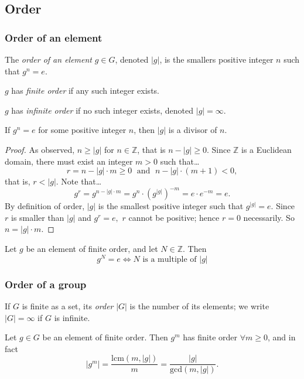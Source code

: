 \subsection{Order}

\subsubsection{Order of an element}\label{elementorder}
The \emph{order of an element} $g \in G$, denoted $|g|$, is the smallers positive integer $n$ such that $g^n = e$.

\noindent $g$ has \emph{finite order} if any such integer exists.\newline

\noindent $g$ has \emph{infinite order} if no such integer exists, denoted $|g| = \infty$.\newline

\begin{lemma}
\label{orderdividesothernums}
If $g^n = e$ for some positive integer $n$, then $|g|$ is a divisor of $n$.
\end{lemma}

\begin{proof}
As observed, $n \geq |g|$ for $n \in \mathbb{Z}$, that is $n - |g| \geq 0$. Since $\mathbb{Z}$ is a Euclidean domain, there must exist
an integer $m > 0$ such that\dots
$$r = n -|g|\cdot m \geq 0 \; \textrm{ and } \; n - |g| \cdot (m + 1) < 0,$$
that is, $r < |g|$. Note that\dots
$$g^r = g^{n - |g| \cdot m} = g^n \cdot (g^{|g|})^{-m} = e \cdot e^{-m} = e.$$
By definition of order, $|g|$ is the smallest positive integer such that $g^{|g|}=e.$ Since $r$ is smaller than $|g|$ and $g^r = e,$ $r$ cannot
be positive; hence $r = 0$ necessarily. So $n = |g| \cdot m$.
\end{proof}

\begin{corollary}
Let $g$ be an element of finite order, and let $N \in \mathbb{Z}$. Then
$$g^N = e \Leftrightarrow N \textrm{ is a multiple of } |g|$$
\end{corollary}

\subsubsection{Order of a group}\label{grouporder}
If $G$ is finite as a set, its \emph{order} $|G|$ is the number of its elements; we write $|G| = \infty$ if $G$ is infinite.

\begin{proposition}
\label{orderofmultipleofelement}
Let $g \in G$ be an element of finite order. Then $g^m$ has finite order $\forall m \geq 0$, and in fact
$$|g^m| = \frac{\textrm{lcm}(m,|g|)}{m} = \frac{|g|}{\textrm{gcd}(m,|g|)}.$$
\end{proposition}

